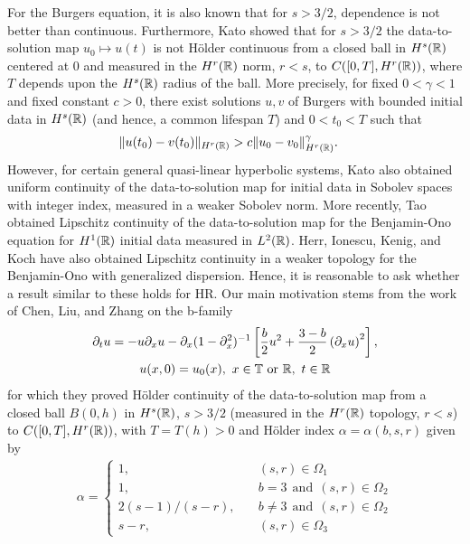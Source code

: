 For the Burgers equation, it is also known that for $s > 3/2$, dependence is not
better than continuous. Furthermore, Kato \cite{Kato:1975}
showed that for $s > 3/2$ the data-to-solution map $u_{0} \mapsto u(t)$ is not
H\"older continuous from a closed ball in $H^{s}(\mathbb{R})$ centered at $0$ and measured
in the $H^{r}(\mathbb{R})$ norm, $r < s$, to $C([0, T], H^{r}(\mathbb{R}))$, where $T$ depends upon
the $H^{s}(\mathbb{R})$ radius of the ball. More precisely, for fixed $0 < \gamma < 1$
and fixed constant $c > 0$,
there exist solutions $u, v$ of Burgers with bounded initial data in $H^{s}(\mathbb{R})$
(and hence, a common lifespan $T$) and $0 < t_{0} < T$ such that
%
%
\begin{equation*}
\begin{split}
\| u(t_{0}) - v(t_{0}) \|_{H^{r}(\mathbb{R})} 
& > c \| u_{0} - v_{0} \|^{\gamma}_{H^{r}(\mathbb{R})}.
\end{split}
\end{equation*}
However, for certain general quasi-linear hyperbolic systems, Kato also obtained
uniform continuity of the data-to-solution map for initial data in Sobolev
spaces with integer index, measured in a weaker Sobolev norm. More recently, Tao
\cite{Tao:2004} obtained Lipschitz continuity of the data-to-solution map
for the Benjamin-Ono equation for $H^{1}(\mathbb{R})$ initial data measured in $L^{2}(\mathbb{R})$.
Herr, Ionescu, Kenig, and Koch \cite{Herr:2010p886} have also obtained Lipschitz
continuity in a weaker topology for the Benjamin-Ono with generalized
dispersion. Hence, it is reasonable to ask whether a result similar to these
holds for HR\@. Our main motivation stems from the work of Chen, Liu, and Zhang
\cite{Chen:2011fk} on the
b-family
%
%
\begin{gather}
\partial_t u =  -u \partial_x u -
\partial_{x} (1 - \partial_{x}^{2})^{-1} \left[ \frac{b}{2}u^2 +
\frac{3-b}{2} \left( \partial_x u \right)^2
\right],
\label{b-family}
\\
u(x,0) = u_0(x), \ x \in \mathbb{T} \ \text{or} \ \mathbb{R}, \ t \in \mathbb{R}
\label{init-cond-iu-b-fam}
\end{gather}
%
%
for which they proved H\"older continuity of the data-to-solution map from a closed ball $B(0, h)$ in $H^{s}(\mathbb{R})$, $s >
3/2$ (measured in the $H^{r}(\mathbb{R})$ topology, $r <s$) to $C([0, T], H^{r}(\mathbb{R}))$, with $T
= T(h)> 0$ and H\"older index $\alpha = \alpha(b, s, r)$ given by 
%
%
\begin{equation*}
\begin{split}
\alpha = 
\begin{cases}
1, \quad & (s, r) \in \Omega_{1}
\\
1, \quad & b=3 \ \ \text{and} \ \ (s, r) \in \Omega_{2}
\\
2(s-1)/(s-r), \quad  & b\neq 3 \ \ \text{and} \ \ (s, r) \in \Omega_{2}
\\
s-r, \quad & (s, r) \in \Omega_{3}
\end{cases}
\end{split}
\end{equation*}
